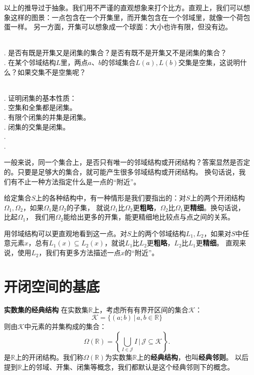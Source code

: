\documentclass[12pt,UTF8]{ctexbook}
\begin{document}
\begin{appendix}
以上的推导过于抽象。我们用不严谨的直观想象来打个比方。直观上，我们可以想象这样的图景：一点包含在一个开集里，而开集包含在一个邻域里，就像一个荷包蛋一样。
另一方面，开集可以想象成一个球面：大小也许有限，但没有边。

\begin{sk}
    \mbox{} \\
    . 是否有既是开集又是闭集的集合？是否有既不是开集又不是闭集的集合？\\
    . 在某个邻域结构$L$里，两点$a$、$b$的邻域集合$L(a), L(b)$交集是空集，这说明什么？如果交集不是空集呢？
\end{sk}

\begin{xt}
    \mbox{} \\
    . 证明闭集的基本性质：\\
    . 空集和全集都是闭集。\\
    . 有限个闭集的并集是闭集。\\
    . 闭集的交集是闭集。\\
    . \\
    .
\end{xt}

一般来说，同一个集合上，是否只有唯一的邻域结构或开闭结构？答案显然是否定的。只要是足够大的集合，就可能产生很多邻域结构或开闭结构。
换句话说，我们有不止一种方法指定什么是一点的“附近”。

给定集合$S$上的各种结构中，有一种情形是我们要指出的：对$S$上的两个开闭结构$\Omega_1, \Omega_2$，如果$\Omega_1$是$\Omega_2$的子集，
就说$\Omega_1$比$\Omega_2$更\textbf{粗略}，$\Omega_2$比$\Omega_1$更\textbf{精细}。换句话说，比起$\Omega_1$，
我们用$\Omega_2$能给出更多的开集，能更精细地比较点与点之间的关系。

用邻域结构可以更直观地看到这一点。对$S$上的两个邻域结构$L_1, L_2$，如果对$S$中任意元素$x$，总有$L_1(x) \subseteq L_2(x)$，就说$L_1$比$L_2$更\textbf{粗略}，$L_2$比$L_1$更\textbf{精细}。
直观来说，使用$L_2$，我们有更多方法描述一点$x$的“附近”。

\section{开闭空间的基底}

\begin{tm}{\textbf{实数集的经典结构}}\label{tm:a-1-0}
    在实数集$\mathbb{R}$上，考虑所有有界开区间的集合$\mathcal{K}$：
    $$ \mathcal{K} = \{ (a;b) \, | \, a, b \in \mathbb{R} \}$$
    则由$\mathcal{K}$中元素的并集构成的集合：
    $$ \Omega(\mathbb{R}) = \left\{\bigcup_{I \in \mathcal{J}} I \, \Bigg| \,\mathcal{J} \subseteq  \mathcal{K} \right\}.$$
    是$\mathbb{R}$上的开闭结构。我们称$\Omega(\mathbb{R})$为实数集$\mathbb{R}$上的\textbf{经典结构}，也叫\textbf{经典邻则}。
    以后提到$\mathbb{R}$上的邻域、开集、闭集等概念，我们都默认是这个经典邻则下的概念。
\end{tm}


\end{appendix}
\end{document}
